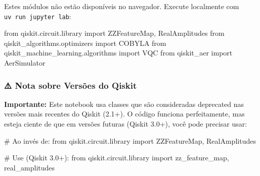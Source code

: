 \documentclass[
  brazilian,
]{report}
\newenvironment{Shaded}{\begin{snugshade}}{\end{snugshade}}
\newcommand{\CommentTok}[1]{\textcolor[rgb]{0.37,0.37,0.37}{#1}}
\newcommand{\ImportTok}[1]{\textcolor[rgb]{0.00,0.46,0.62}{#1}}
\newcommand{\NormalTok}[1]{\textcolor[rgb]{0.00,0.23,0.31}{#1}}
\begin{document}
\begin{tcolorbox}[enhanced jigsaw, arc=.35mm, bottomrule=.15mm, bottomtitle=1mm, breakable, colback=white, colbacktitle=quarto-callout-note-color!10!white, colframe=quarto-callout-note-color-frame, coltitle=black, left=2mm, leftrule=.75mm, opacityback=0, opacitybacktitle=0.6, rightrule=.15mm, title=\textcolor{quarto-callout-note-color}{\faInfo}\hspace{0.5em}{🔒 Imports do Qiskit (requerem execução local)}, titlerule=0mm, toprule=.15mm, toptitle=1mm]

Estes módulos não estão disponíveis no navegador. Execute localmente com
\texttt{uv\ run\ jupyter\ lab}:

\begin{Shaded}
\begin{Highlighting}[]
\ImportTok{from}\NormalTok{ qiskit.circuit.library }\ImportTok{import}\NormalTok{ ZZFeatureMap, RealAmplitudes}
\ImportTok{from}\NormalTok{ qiskit\_algorithms.optimizers }\ImportTok{import}\NormalTok{ COBYLA}
\ImportTok{from}\NormalTok{ qiskit\_machine\_learning.algorithms }\ImportTok{import}\NormalTok{ VQC}
\ImportTok{from}\NormalTok{ qiskit\_aer }\ImportTok{import}\NormalTok{ AerSimulator}
\end{Highlighting}
\end{Shaded}

\end{tcolorbox}

\subsubsection{⚠️ Nota sobre Versões do
Qiskit}\label{nota-sobre-versuxf5es-do-qiskit}

\textbf{Importante:} Este notebook usa classes que são consideradas
deprecated nas versões mais recentes do Qiskit (2.1+). O código funciona
perfeitamente, mas esteja ciente de que em versões futuras (Qiskit
3.0+), você pode precisar usar:

\begin{Shaded}
\begin{Highlighting}[]
\CommentTok{\# Ao invés de:}
\ImportTok{from}\NormalTok{ qiskit.circuit.library }\ImportTok{import}\NormalTok{ ZZFeatureMap, RealAmplitudes}

\CommentTok{\# Use (Qiskit 3.0+):}
\ImportTok{from}\NormalTok{ qiskit.circuit.library }\ImportTok{import}\NormalTok{ zz\_feature\_map, real\_amplitudes}
\end{Highlighting}
\end{Shaded}
\end{document}
